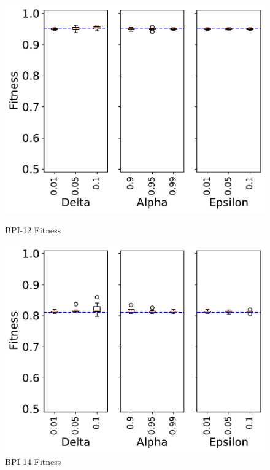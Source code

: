 \documentclass[landscape]{article}
\begin{document}
\begin{figure}[!htb]
	\centering
	\begin{minipage}{0.2\textwidth}
		\includegraphics[width=1.0\textwidth]{../BPI_Challenge_2012/BPI_Challenge_2012_param_fitness.pdf}
		\caption{BPI-12 Fitness}
	\end{minipage}
	\hfill
	\begin{minipage}{0.2\textwidth}
		\includegraphics[width=1.0\textwidth]{../Detail_Incident_Activity/Detail_Incident_Activity_param_fitness.pdf}
		\caption{BPI-14 Fitness}
	\end{minipage}
	\hfill
	\begin{minipage}{0.2\textwidth}

\end{minipage}
\end{figure}
\end{document}
